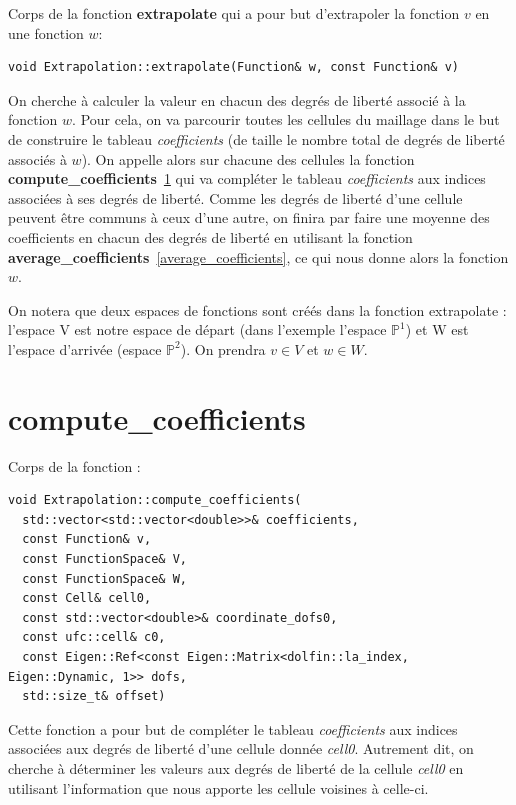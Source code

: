 \documentclass[french]{article}
\begin{document}
	
	Corps de la fonction \textbf{extrapolate} qui a pour but d'extrapoler la fonction $v$ en une fonction $w$:

	\begin{lstlisting}
void Extrapolation::extrapolate(Function& w, const Function& v)
	\end{lstlisting}
	
	On cherche à calculer la valeur en chacun des degrés de liberté associé à la fonction $w$. Pour cela, on va parcourir toutes les cellules du maillage dans le but de construire le tableau \textit{coefficients} (de taille le nombre total de degrés de liberté associés à $w$). On appelle alors sur chacune des cellules la fonction \textbf{compute\_coefficients}~\ref{compute_coefficients} qui va compléter le tableau \textit{coefficients} aux indices associées à ses degrés de liberté. Comme les degrés de liberté d'une cellule peuvent être communs à ceux d'une autre, on finira par faire une moyenne des coefficients en chacun des degrés de liberté en utilisant la fonction \textbf{average\_coefficients}~\ref{average_coefficients}, ce qui nous donne alors la fonction $w$. 
	
	On notera que deux espaces de fonctions sont créés dans la fonction extrapolate : l'espace V est notre espace de départ (dans l'exemple l'espace $\mathbb{P}^1$) et W est l'espace d'arrivée (espace $\mathbb{P}^2$). On prendra $v\in V$ et $w\in W$.
	
	\section{compute\_coefficients}
	\label{compute_coefficients}
	
	Corps de la fonction :
	
	\begin{lstlisting}
void Extrapolation::compute_coefficients(
  std::vector<std::vector<double>>& coefficients,
  const Function& v,
  const FunctionSpace& V,
  const FunctionSpace& W,
  const Cell& cell0,
  const std::vector<double>& coordinate_dofs0,
  const ufc::cell& c0,
  const Eigen::Ref<const Eigen::Matrix<dolfin::la_index, Eigen::Dynamic, 1>> dofs,
  std::size_t& offset)
	\end{lstlisting}
	
	Cette fonction a pour but de compléter le tableau \textit{coefficients} aux indices associées aux degrés de liberté d'une cellule donnée \textit{cell0}. Autrement dit, on cherche à déterminer les valeurs aux degrés de liberté de la cellule \textit{cell0} en utilisant l'information que nous apporte les cellule voisines à celle-ci.\\
	
\end{document}

